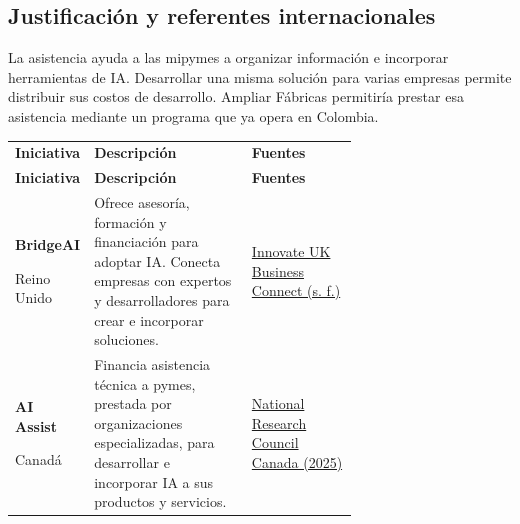 \subsection{Justificación y referentes internacionales}

La asistencia ayuda a las mipymes a organizar información e incorporar herramientas de IA. Desarrollar una misma solución para varias empresas permite distribuir sus costos de desarrollo. Ampliar Fábricas permitiría prestar esa asistencia mediante un programa que ya opera en Colombia.

\begingroup
\small
{}
\setlength{\tabcolsep}{4pt}
\renewcommand{\arraystretch}{1.1}
\setlength{\LTpre}{4pt}
\setlength{\LTpost}{6pt}
\begin{longtable}{@{}>{\raggedright\arraybackslash}p{0.22\linewidth}>{\raggedright\arraybackslash}p{0.46\linewidth}>{\raggedright\arraybackslash}p{}@{}}
\multicolumn{3}{@{}l}{\textbf{Referentes internacionales}}\\[3pt]
\toprule
\textbf{Iniciativa} & \textbf{Descripción} & \textbf{Fuentes} \\
\midrule
\endfirsthead
\toprule
\textbf{Iniciativa} & \textbf{Descripción} & \textbf{Fuentes} \\
\midrule
\endhead
\bottomrule
\endfoot
\textbf{BridgeAI}\par Reino Unido & Ofrece asesoría, formación y financiación para adoptar IA. Conecta empresas con expertos y desarrolladores para crear e incorporar soluciones. & \href{https://iuk-business-connect.org.uk/programme/bridgeai/}{Innovate UK Business Connect (s. f.)} \\
\addlinespace[5pt]
\textbf{AI Assist}\par Canadá & Financia asistencia técnica a pymes, prestada por organizaciones especializadas, para desarrollar e incorporar IA a sus productos y servicios. & \href{https://www.nrc.canada.ca/en/support-technology-innovation/ai-assist-call-proposals-organizations}{National Research Council Canada (2025)} \\
\end{longtable}
\endgroup


